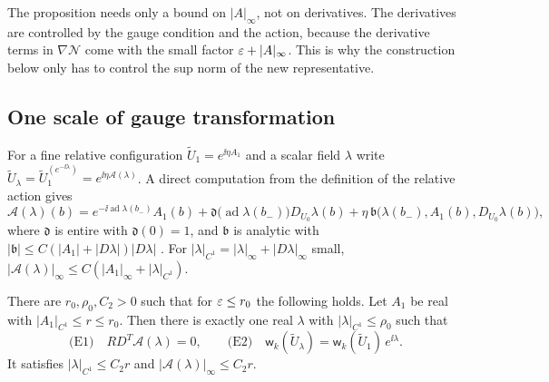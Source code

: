 The proposition needs only a bound on $|A|_\infty$, not on derivatives. The derivatives are controlled by the gauge condition and the action, because the derivative terms in $\nabla\mathcal N$ come with the small factor $\varepsilon+|A|_\infty$. This is why the construction below only has to control the sup norm of the new representative.

\subsection{One scale of gauge transformation}\label{ss:24.5}

For a fine relative configuration $\tilde U_1=e^{\ii\eta A_1}$ and a scalar field $\lambda$ write $\tilde U_\lambda=\tilde U_1^{(e^{-\ii\lambda})}=e^{\ii\eta\mathcal A(\lambda)}$. A direct computation from the definition of the relative action gives
\begin{equation}\label{eq:gauge-formula}
\mathcal A(\lambda)(b)=e^{-\ii\operatorname{ad}\lambda(b_-)}A_1(b)+\mathfrak d\big(\operatorname{ad}\lambda(b_-)\big)D_{U_0}\lambda(b)+\eta\,\mathfrak b\big(\lambda(b_-),A_1(b),D_{U_0}\lambda(b)\big),
\end{equation}
where $\mathfrak d$ is entire with $\mathfrak d(0)=1$, and $\mathfrak b$ is analytic with $|\mathfrak b|\le C(|A_1|+|D\lambda|)|D\lambda|$ \cite[(1.81)--(1.84)]{BalReg}. For $|\lambda|_{C^1}=|\lambda|_\infty+|D\lambda|_\infty$ small, $|\mathcal A(\lambda)|_\infty\le C(|A_1|_\infty+|\lambda|_{C^1})$.

\begin{lemma}\label{lem:one-scale}
There are $r_0,\rho_0,C_2>0$ such that for $\varepsilon\le r_0$ the following holds. Let $A_1$ be real with $|A_1|_{C^1}\le r\le r_0$. Then there is exactly one real $\lambda$ with $|\lambda|_{C^1}\le\rho_0$ such that
\[
\text{(E1)}\quad R D^T\mathcal A(\lambda)=0,\qquad\text{(E2)}\quad\mathsf w_k(\tilde U_\lambda)=\mathsf w_k(\tilde U_1)\,e^{\ii\lambda}.
\]
It satisfies $|\lambda|_{C^1}\le C_2r$ and $|\mathcal A(\lambda)|_\infty\le C_2r$.
\end{lemma}

